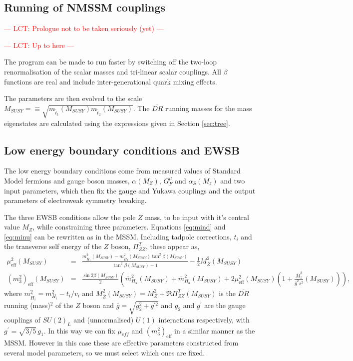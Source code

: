 \documentclass[final,3p,times,pdflatex]{elsarticle}
\newcommand{\ba}{\begin{eqnarray}}
\newcommand{\ea}{\end{eqnarray}}
\newcommand*{\red}[1]{\textcolor{red}{#1}}
\begin{document}
\subsection{Running of NMSSM couplings~\label{running}}
\red{--- LCT: Prologue not to be taken seriously (yet) ---}



\textcolor{red}{--- LCT: Up to here ---}

The program 
can be made to run faster by switching off the two-loop renormalisation of 
the scalar masses and tri-linear scalar couplings. All
$\beta$ functions are real and include inter-generational quark mixing
effects. 


The parameters are then evolved to the scale $M_{SUSY}= \equiv
\sqrt{m_{{\tilde t}_1}(M_{SUSY}) m_{{\tilde t}_2}(M_{SUSY})}$.  The
$\overline{DR}$ running masses for the mass eigenstates are calculated
using the expressions given in Section \ref{sec:tree}.
\subsection{Low energy boundary conditions and EWSB \label{ewsb}}
The low energy boundary conditions come from measured values of
Standard Model fermions and gauge boson masses, $\alpha(M_Z)$,
$G_F^\mu$ and $\alpha_S(M_z)$ and two input parameters, which then fix
the gauge and Yukawa couplings and the output parameters of
electroweak symmetry breaking.
 
   The three EWSB conditions allow the pole $Z$ mass, to be input with
   it's central value $M_Z$, while constraining three parameters.
   Equations \ref{eq:mind} and \ref{eq:minu} can be rewritten as in
   the MSSM.  Including tadpole corrections, $t_i$ and the transverse
   self energy of the $Z$ boson, $\Pi^T_{ZZ}$, these appear as, \ba
   \mu_\textrm{eff}^2(M_{SUSY}) &=&
   \frac{m_{\overline{H}_1}^2(M_{SUSY}) -
     m_{\overline{H}_2}^2(M_{SUSY}) \tan^2 \beta(M_{SUSY})}{\tan^2
     \beta(M_{SUSY}) - 1} - \frac{1}{2} M_{\overline Z}^2
   (M_{SUSY})\label{eq:mueffcond}\\ (m^2_3)_\textrm{eff}(M_{SUSY})&=&\frac{\sin{2\beta}(M_{SUSY})}{2}\left(\overline{m}_{H_u}^2(M_{SUSY})+\overline{m}_{H_d}^2(M_{SUSY})+
   2\mu_\textrm{eff}^2(M_{SUSY})\left(1+\frac{\overline{M}_z^2}{\overline{g}^2s^2}(M_{SUSY})\right)\right),\label{eq:bmucond}
   \ea where $m_{\overline{H}_i}^2 = m_{H_i}^2 - t_i/v_i$ and
   $M_{\overline Z}^2(M_{SUSY}) = M_Z^2 + \Re\Pi_{ZZ}^T(M_{SUSY})$ is
   the $\overline{DR}$ running (mass)$^2$ of the $Z$ boson and $\bar g
   = \sqrt{g_2^2+g^{\prime 2}}$ and $g_2$ and $g^{\prime}$ are the
   gauge couplings of $SU(2)_L$ and (unnormalised) $U(1)$ interactions
   respectively, with $g^\prime = \sqrt{3/5} \, g_1$.  In this way we
   can fix $\mu_{eff}$ and $(m^2_3)_\textrm{eff}$ in a similar manner
   as the MSSM.  However in this case these are effective parameters
   constructed from several model parameters, so we must select which
   ones are fixed.
\end{document}
